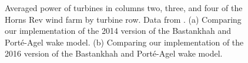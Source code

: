 \documentclass[conf]{new-aiaa}
\begin{document}
\begin{figure}[ht]
	\centering
	\caption{Averaged power of turbines in columns two, three, and four of the Horns Rev wind farm by turbine row. Data from \cite{niayifar2016}. (a) Comparing our implementation of the 2014 version of the Bastankhah and Port\'{e}-Agel wake model. (b) Comparing our implementation of the 2016 version of the Bastankhah and Port\'{e}-Agel wake model.}
	\label{fig:power_line}
\end{figure}
\end{document}
